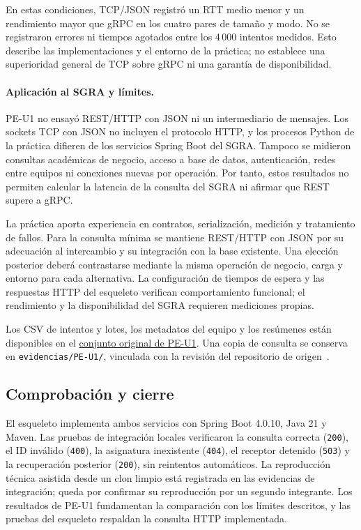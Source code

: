 En estas condiciones, TCP/JSON registró un RTT medio menor y un rendimiento mayor que gRPC en los cuatro pares de tamaño y modo. No se registraron errores ni tiempos agotados entre los 4\,000 intentos medidos. Esto describe las implementaciones y el entorno de la práctica; no establece una superioridad general de TCP sobre gRPC ni una garantía de disponibilidad.

\paragraph{Aplicación al SGRA y límites.}
PE-U1 no ensayó REST/HTTP con JSON ni un intermediario de mensajes. Los sockets TCP con JSON no incluyen el protocolo HTTP, y los procesos Python de la práctica difieren de los servicios Spring Boot del SGRA. Tampoco se midieron consultas académicas de negocio, acceso a base de datos, autenticación, redes entre equipos ni conexiones nuevas por operación. Por tanto, estos resultados no permiten calcular la latencia de la consulta del SGRA ni afirmar que REST supere a gRPC.

La práctica aporta experiencia en contratos, serialización, medición y tratamiento de fallos. Para la consulta mínima se mantiene REST/HTTP con JSON por su adecuación al intercambio y su integración con la base existente. Una elección posterior deberá contrastarse mediante la misma operación de negocio, carga y entorno para cada alternativa. La configuración de tiempos de espera y las respuestas HTTP del esqueleto verifican comportamiento funcional; el rendimiento y la disponibilidad del SGRA requieren mediciones propias.

Los CSV de intentos y lotes, los metadatos del equipo y los resúmenes están disponibles en el \href{https://github.com/BelindaTZ/GA-SUM-02-PE-U1/tree/7bdd543dffd08b08d881db2803629abe5b1811fa/data/comparativa_procesos_20261121_150936}{conjunto original de PE-U1}. Una copia de consulta se conserva en \nolinkurl{evidencias/PE-U1/}, vinculada con la revisión del repositorio de origen~\cite{peu1-2026-resultados}.

\subsection{Comprobación y cierre}
El esqueleto implementa ambos servicios con Spring Boot 4.0.10, Java 21 y Maven. Las pruebas de integración locales verificaron la consulta correcta (\texttt{200}), el ID inválido (\texttt{400}), la asignatura inexistente (\texttt{404}), el receptor detenido (\texttt{503}) y la recuperación posterior (\texttt{200}), sin reintentos automáticos. La reproducción técnica asistida desde un clon limpio está registrada en las evidencias de integración; queda por confirmar su reproducción por un segundo integrante. Los resultados de PE-U1 fundamentan la comparación con los límites descritos, y las pruebas del esqueleto respaldan la consulta HTTP implementada.
